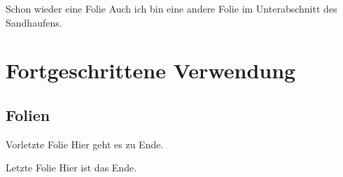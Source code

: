 \documentclass{beamer}
\begin{document}
  \begin{frame}{Schon wieder eine Folie}
    Auch ich bin eine andere Folie im Unterabschnitt des Sandhaufens.
  \end{frame}

  \section{Fortgeschrittene Verwendung}

  \subsection{Folien}

  \begin{frame}{Vorletzte Folie}
    Hier geht es zu Ende.
  \end{frame}

  \begin{frame}{Letzte Folie}
    Hier ist das Ende.
  \end{frame}
\end{document}
